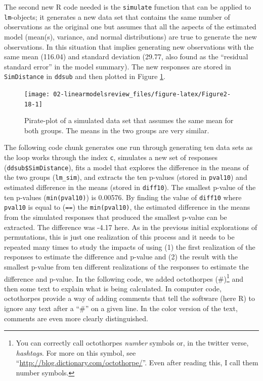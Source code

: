 \documentclass[
]{book}
\begin{document}
The second new R code needed is the \texttt{simulate}  function that can be applied to \texttt{lm}-objects; it generates a new data set that contains the same number of observations as the original one but assumes that all the aspects of the estimated model (mean(s), variance, and normal distributions) are true to generate the new observations. In this situation that implies generating new observations with the same mean (116.04) and standard deviation (29.77, also found as the ``residual standard error'' in the model summary).  The new responses are stored in \texttt{SimDistance} in \texttt{ddsub} and then plotted in Figure \ref{fig:Figure2-18}.



\begin{figure}[ht!]

{\centering \texttt{[image: 02-linearmodelsreview\_files/figure-latex/Figure2-18-1]} 

}

\caption{Pirate-plot of a simulated data set that assumes the same mean for both groups. The means in the two groups are very similar.}\label{fig:Figure2-18}
\end{figure}

\indent The following code chunk generates one run through generating ten data sets as the loop works through the index \texttt{c}, simulates a new set of responses (\texttt{ddsub\$SimDistance}), fits a model that explores the difference in the means of the two groups (\texttt{lm\_sim}), and extracts the ten p-values (stored in \texttt{pval10}) and estimated difference in the means (stored in \texttt{diff10}). The smallest p-value of the ten p-values (\texttt{min(pval10)}) is 0.00576. By finding the value of \texttt{diff10} where \texttt{pval10} is equal to (\texttt{==}) the \texttt{min(pval10)}, the estimated difference in the means from the simulated responses that produced the smallest p-value can be extracted. The difference was -4.17 here. As in the previous initial explorations of permutations, this is just one realization of this process and it needs to be repeated many times to study the impacts of using (1) the first realization of the responses to estimate the difference and p-value and (2) the result with the smallest p-value from ten different realizations of the responses to estimate the difference and p-value. In the following code, we added
octothorpes (\#)\footnote{You can correctly call octothorpes \emph{number} symbols or, in the
  twitter verse, \emph{hashtags}. For more on this symbol, see
  ``\url{http://blog.dictionary.com/octothorpe/}''. Even after reading this, I call them
  number symbols.} and then some text to explain what is being calculated. In computer code, octothorpes
provide a way of adding comments that tell the software (here R) to ignore any
text after a ``\#'' on a given line. In the color version of the text, comments are
even more clearly distinguished.
\end{document}
